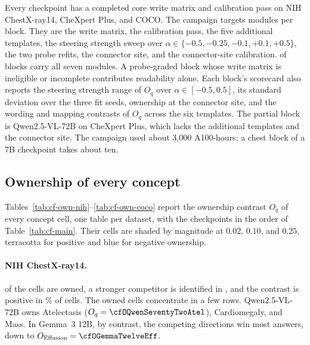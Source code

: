 Every checkpoint has a completed core write matrix and calibration pass on NIH ChestX-ray14, CheXpert Plus, and COCO. The campaign targets \cfCoveragePlannedWord{} modules per block. They are the write matrix, the calibration pass, the five additional templates, the steering strength sweep over $\alpha\in\{-0.5,-0.25,-0.1,+0.1,+0.5\}$, the two probe refits, the connector site, and the connector-site calibration. \cfCoverageBlocksAllSeven{} of \cfBlocks{} blocks carry all seven modules. A probe-graded block whose write matrix is ineligible or incomplete contributes readability alone. Each block's scorecard also reports the steering strength range of $O_q$ over $\alpha\in[-0.5,0.5]$, its standard deviation over the three fit seeds, ownership at the connector site, and the wording and mapping contrasts of $O_q$ across the six templates. The partial block is Qwen2.5-VL-72B on CheXpert Plus, which lacks the additional templates and the connector site. The campaign used about 3,000 A100-hours; a chest block of a 7B checkpoint takes about ten.


\subsection{Ownership of every concept}
\label{app:cf-tables}

Tables~\ref{tab:cf-own-nih}--\ref{tab:cf-own-coco} report the ownership contrast $O_q$ of every concept cell, one table per dataset, with the checkpoints in the order of Table~\ref{tab:cf-main}. Their cells are shaded by magnitude at $0.02$, $0.10$, and $0.25$, terracotta for positive and blue for negative ownership.

\paragraph{NIH ChestX-ray14.} \cfNihOwned{} of the \cfNihCells{} cells are owned, a stronger competitor is identified in \cfNihCompetitor{}, and the contrast is positive in \cfGeoOwnWinsNihPct\% of cells. The owned cells concentrate in a few rows. Qwen2.5-VL-72B owns Atelectasis ($O_q=\cfOQwenSeventyTwoAtel$), Cardiomegaly, and Mass. In Gemma~3 12B, by contrast, the competing directions win most answers, down to $O_{\mathrm{Effusion}}=\cfOGemmaTwelveEff$.





